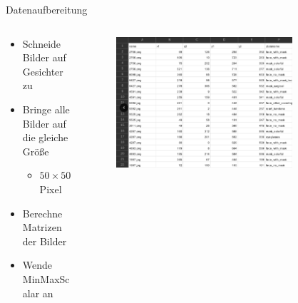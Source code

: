 \documentclass[aspectratio=1610, 9pt]{beamer}
\begin{document}
\begin{frame}{Datenaufbereitung}
  \begin{columns}
    \begin{column}{0.48\textwidth}
      \begin{itemize}
        \item Schneide Bilder auf Gesichter zu
        \item Bringe alle Bilder auf die gleiche Größe
        \begin{itemize}
          \item $50 \times 50$ Pixel
        \end{itemize}
        \item Berechne Matrizen der Bilder
        \item Wende MinMaxScalar an
      \end{itemize}
    \end{column}
    \begin{column}{0.48\textwidth}
      \begin{figure}
        \centering
        \includegraphics[width = 0.8\textwidth]{images/Datensatz.png}
      \end{figure}
    \end{column}
  \end{columns}
\end{frame}
\end{document}
